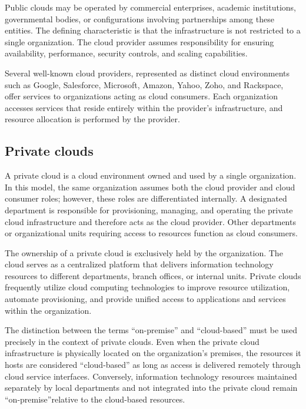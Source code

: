 \documentclass[11pt,a4paper,openany]{report}
\begin{document}
Public clouds may be operated by commercial enterprises, academic institutions, governmental bodies, or configurations involving partnerships among these entities. The defining characteristic is that the infrastructure is not restricted to a single organization. The cloud provider assumes responsibility for ensuring availability, performance, security controls, and scaling capabilities.

Several well-known cloud providers, represented as distinct cloud environments such as Google, Salesforce, Microsoft, Amazon, Yahoo, Zoho, and Rackspace, offer services to organizations acting as cloud consumers. Each organization accesses services that reside entirely within the provider's infrastructure, and resource allocation is performed by the provider.

\subsection{Private clouds}

A private cloud is a cloud environment owned and used by a single organization. In this model, the same organization assumes both the cloud provider and cloud consumer roles; however, these roles are differentiated internally. A designated department is responsible for provisioning, managing, and operating the private cloud infrastructure and therefore acts as the cloud provider. Other departments or organizational units requiring access to resources function as cloud consumers.

The ownership of a private cloud is exclusively held by the organization. The cloud serves as a centralized platform that delivers information technology resources to different departments, branch offices, or internal units. Private clouds frequently utilize cloud computing technologies to improve resource utilization, automate provisioning, and provide unified access to applications and services within the organization.

The distinction between the terms ``on-premise'' and ``cloud-based'' must be used precisely in the context of private clouds. Even when the private cloud infrastructure is physically located on the organization's premises, the resources it hosts are considered ``cloud-based'' as long as access is delivered remotely through cloud service interfaces. Conversely, information technology resources maintained separately by local departments and not integrated into the private cloud remain ``on-premise''relative to the cloud-based resources.
\end{document}
